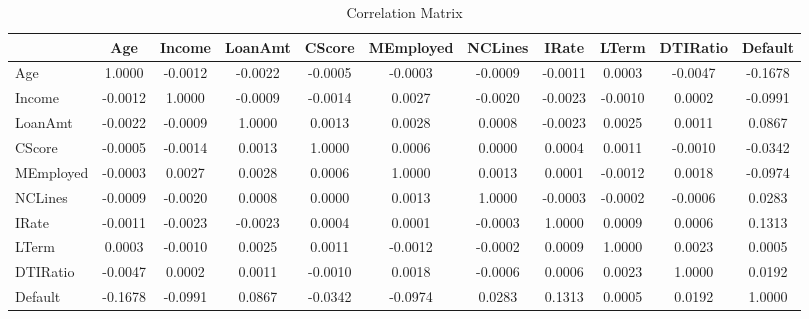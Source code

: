 \documentclass[12pt]{article}
\begin{document}
\begin{table}[htbp]
    \centering
    \caption{Correlation Matrix}
    \small
    \begin{adjustbox}{width=\textwidth}
    \begin{tabular}{l*{10}{@{\extracolsep{4pt}}c}}
        \toprule
        & Age & Income & LoanAmt & CScore & MEmployed & NCLines & IRate & LTerm & DTIRatio & Default \\
        \midrule
        Age & 1.0000 & -0.0012 & -0.0022 & -0.0005 & -0.0003 & -0.0009 & -0.0011 & 0.0003 & -0.0047 & -0.1678 \\
        Income & -0.0012 & 1.0000 & -0.0009 & -0.0014 & 0.0027 & -0.0020 & -0.0023 & -0.0010 & 0.0002 & -0.0991 \\
        LoanAmt & -0.0022 & -0.0009 & 1.0000 & 0.0013 & 0.0028 & 0.0008 & -0.0023 & 0.0025 & 0.0011 & 0.0867 \\
        CScore & -0.0005 & -0.0014 & 0.0013 & 1.0000 & 0.0006 & 0.0000 & 0.0004 & 0.0011 & -0.0010 & -0.0342 \\
        MEmployed & -0.0003 & 0.0027 & 0.0028 & 0.0006 & 1.0000 & 0.0013 & 0.0001 & -0.0012 & 0.0018 & -0.0974 \\
        NCLines & -0.0009 & -0.0020 & 0.0008 & 0.0000 & 0.0013 & 1.0000 & -0.0003 & -0.0002 & -0.0006 & 0.0283 \\
        IRate & -0.0011 & -0.0023 & -0.0023 & 0.0004 & 0.0001 & -0.0003 & 1.0000 & 0.0009 & 0.0006 & 0.1313 \\
        LTerm & 0.0003 & -0.0010 & 0.0025 & 0.0011 & -0.0012 & -0.0002 & 0.0009 & 1.0000 & 0.0023 & 0.0005 \\
        DTIRatio & -0.0047 & 0.0002 & 0.0011 & -0.0010 & 0.0018 & -0.0006 & 0.0006 & 0.0023 & 1.0000 & 0.0192 \\
        Default & -0.1678 & -0.0991 & 0.0867 & -0.0342 & -0.0974 & 0.0283 & 0.1313 & 0.0005 & 0.0192 & 1.0000 \\
        \bottomrule
    \end{tabular}
    \end{adjustbox}
\end{table}
\end{document}
